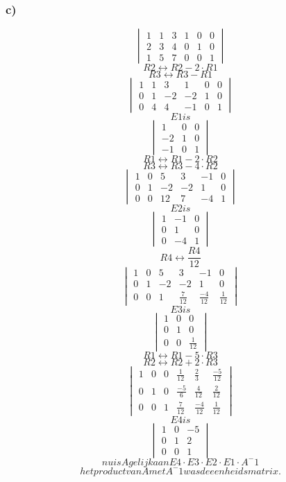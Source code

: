 \documentclass[lineaire_algebra_oplossingen.tex]{subfiles}
\begin{document}
\subsubsection*{c)}
\[
\begin{vmatrix}
1 & 1 & 3 & 1 & 0 & 0\\
2 & 3 & 4 & 0 & 1 & 0\\
1 & 5 & 7 & 0 & 0 & 1
\end{vmatrix}
\]
\[ R2 \leftrightarrow R2 - 2 \cdot R1 \]
\[ R3 \leftrightarrow R3 - R1 \]
\[ 
\begin{vmatrix}
1 & 1 & 3 & 1 & 0 & 0\\
0 & 1 & -2 & -2 & 1 & 0\\
0 & 4 & 4  & -1 & 0 & 1
\end{vmatrix}
\]
\[E1 is\] 
\[
\begin{vmatrix}
1 & 0 & 0\\
-2 & 1 & 0\\
-1 & 0 & 1
\end{vmatrix}
\]
\[ R1 \leftrightarrow R1 - 2 \cdot R2 \]
\[ R3 \leftrightarrow R3 - 4 \cdot R2 \]
\[ 
\begin{vmatrix}
1 & 0 & 5 & 3 & -1 & 0\\
0 & 1 & -2 & -2 & 1 & 0\\
0 & 0 & 12 & 7 & -4 & 1
\end{vmatrix}
\]
\[E2 is \]
\[
\begin{vmatrix}
1 & -1 & 0\\
0 & 1 & 0\\
0 & -4 & 1
\end{vmatrix}
\]
\[ R4 \leftrightarrow\frac{R4}{12} \]
\[ 
\begin{vmatrix}
1 & 0 & 5 & 3 & -1 & 0\\
0 & 1 & -2 & -2 & 1 & 0\\
0 & 0 & 1 & \frac{7}{12} & \frac{-4}{12} & \frac{1}{12}
\end{vmatrix}
\]
\[ E3 is  \]
\[
\begin{vmatrix}
1 & 0 & 0\\
0 & 1 & 0\\
0 & 0 & \frac{1}{12}
\end{vmatrix}
\]
\[ R1 \leftrightarrow R1 - 5 \cdot R3 \]
\[ R2 \leftrightarrow R2 + 2 \cdot R3 \]
\[ 
\begin{vmatrix}
1 & 0 & 0 & \frac{1}{12} & \frac{2}{3} & \frac{-5}{12}\\
0 & 1 & 0 & \frac{-5}{6} & \frac{4}{12} & \frac{2}{12}\\
0 & 0 & 1 & \frac{7}{12} & \frac{-4}{12} & \frac{1}{12}
\end{vmatrix}
\]
\[ E4 is  \]
\[
\begin{vmatrix}
1 & 0 & -5\\
0 & 1 & 2\\
0 & 0 & 1
\end{vmatrix}
\]
\[ nu is A gelijk aan E4 \cdot E3 \cdot E2 \cdot E1 \cdot A^-1 \]
\[ het product van A met A^-1 was de eenheidsmatrix. \]
\end{document}
